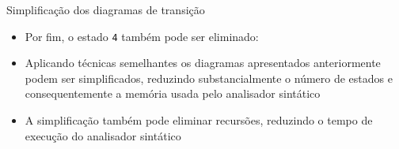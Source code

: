 \begin{frame}[fragile]{Simplificação dos diagramas de transição}

    \begin{itemize}
        \item Por fim, o estado \texttt{4} também pode ser eliminado:
        \begin{center}
        \end{center}

        \item Aplicando técnicas semelhantes os diagramas apresentados anteriormente podem ser simplificados, reduzindo substancialmente o número de estados e
            consequentemente a memória usada pelo analisador sintático

        \item A simplificação também pode eliminar recursões, reduzindo o tempo de execução do analisador sintático 
    \end{itemize}

\end{frame}

